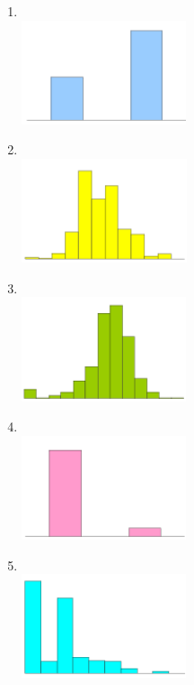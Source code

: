 \documentclass[12pt]{article}
\begin{document}
\begin{enumerate}
\begin{multicols}{3}

\begin{enumerate}

\item[(1)] $\:$ \\
\includegraphics[height=1.2in]{figures/gender}

\item[(2)] $\:$ \\
\includegraphics[height=1.2in]{figures/height}

\item[(3)] $\:$ \\
\includegraphics[height=1.2in]{figures/sleep}

\item[(4)] $\:$ \\
\includegraphics[height=1.2in]{figures/off_campus}

\item[(5)] $\:$ \\
\includegraphics[height=1.2in]{figures/piercings}


\end{enumerate}
\end{multicols}
\end{enumerate}
\end{document}
